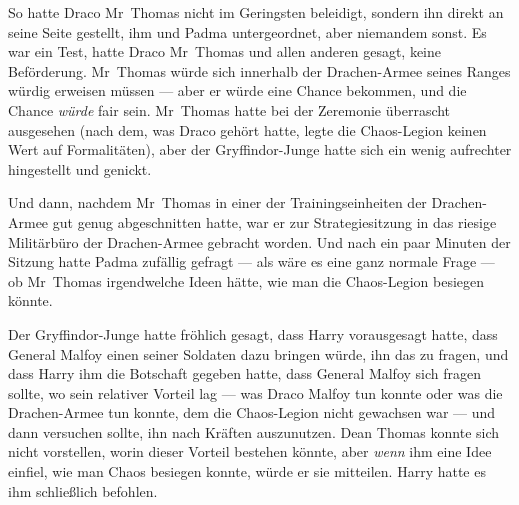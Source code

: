 So hatte Draco Mr~Thomas nicht im Geringsten beleidigt, sondern ihn direkt an seine Seite gestellt, ihm und Padma untergeordnet, aber niemandem sonst. Es war ein Test, hatte Draco Mr~Thomas und allen anderen gesagt, keine Beförderung. Mr~Thomas würde sich innerhalb der Drachen-Armee seines Ranges würdig erweisen müssen — aber er würde eine Chance bekommen, und die Chance \emph{würde} fair sein. Mr~Thomas hatte bei der Zeremonie überrascht ausgesehen (nach dem, was Draco gehört hatte, legte die Chaos-Legion keinen Wert auf Formalitäten), aber der Gryffindor-Junge hatte sich ein wenig aufrechter hingestellt und genickt.

Und dann, nachdem Mr~Thomas in einer der Trainingseinheiten der Drachen-Armee gut genug abgeschnitten hatte, war er zur Strategiesitzung in das riesige Militärbüro der Drachen-Armee gebracht worden. Und nach ein paar Minuten der Sitzung hatte Padma zufällig gefragt — als wäre es eine ganz normale Frage — ob Mr~Thomas irgendwelche Ideen hätte, wie man die Chaos-Legion besiegen könnte.

Der Gryffindor-Junge hatte fröhlich gesagt, dass Harry vorausgesagt hatte, dass General Malfoy einen seiner Soldaten dazu bringen würde, ihn das zu fragen, und dass Harry ihm die Botschaft gegeben hatte, dass General Malfoy sich fragen sollte, wo sein relativer Vorteil lag — was Draco Malfoy tun konnte oder was die Drachen-Armee tun konnte, dem die Chaos-Legion nicht gewachsen war — und dann versuchen sollte, ihn nach Kräften auszunutzen. Dean Thomas konnte sich nicht vorstellen, worin dieser Vorteil bestehen könnte, aber \emph{wenn} ihm eine Idee einfiel, wie man Chaos besiegen konnte, würde er sie mitteilen. Harry hatte es ihm schließlich befohlen.

